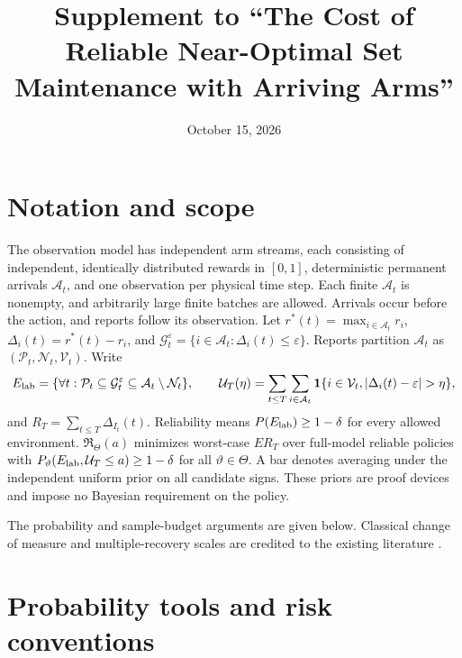 \documentclass[11pt]{article}
\title{Supplement to ``The Cost of Reliable Near-Optimal Set Maintenance with Arriving Arms''}
\author{}
\date{October 15, 2026}
\theoremstyle{remark}
\newcommand{\ind}{\mathbf 1}
\begin{document}
\maketitle
\section*{Notation and scope}
The observation model has independent arm streams, each consisting of
independent, identically distributed rewards in $[0,1]$, deterministic
permanent arrivals $\mathcal A_t$, and one observation per physical time step.
Each finite $\mathcal A_t$ is nonempty, and arbitrarily large finite batches
are allowed. Arrivals occur before the action, and reports follow its
observation. Let $r^*(t)=\max_{i\in\mathcal A_t}r_i$,
$\Delta_i(t)=r^*(t)-r_i$, and
$\mathcal G_t^\varepsilon=\{i\in\mathcal A_t:\Delta_i(t)\le\varepsilon\}$.
Reports partition $\mathcal A_t$ as
$(\mathcal P_t,\mathcal N_t,\mathcal V_t)$. Write
\[
 E_{\rm lab}=\{\forall t:\mathcal P_t\subseteq\mathcal G_t^\varepsilon
                      \subseteq\mathcal A_t\setminus\mathcal N_t\},\qquad
 \mathcal U_T(\eta)=\sum_{t\le T}\sum_{i\in\mathcal A_t}
 \ind\{i\in\mathcal V_t,|\Delta_i(t)-\varepsilon|>\eta\},
\]
and $R_T=\sum_{t\le T}\Delta_{I_t}(t)$. Reliability means
$P(E_{\rm lab})\ge1-\delta$ for every allowed environment.
$\mathfrak R_\Theta(a)$ minimizes worst-case $ER_T$ over full-model reliable
policies with $P_\vartheta(E_{\rm lab},\mathcal U_T\le a)\ge1-\delta$ for all
$\vartheta\in\Theta$. A bar denotes averaging under the independent uniform
prior on all candidate signs. These priors are proof devices and impose no
Bayesian requirement on the policy.

The probability and sample-budget arguments are given below. Classical
change of measure and multiple-recovery scales are credited to the existing
literature \citep{kaufmann2016,malloy2014,jamieson2018,mason2020}.


\makeatletter
\renewcommand{\@pnumwidth}{2.8em}
\renewcommand{\@tocrmarg}{3.8em}
\renewcommand{\l@section}{\@dottedtocline{1}{0em}{3em}}
\renewcommand{\l@subsection}{\@dottedtocline{2}{1.5em}{4em}}
\renewcommand{\l@subsubsection}{\@dottedtocline{3}{3.8em}{5em}}
\makeatother
\tableofcontents
\medskip
\section{Probability tools and risk conventions}
\label{app:tools}
\end{document}
